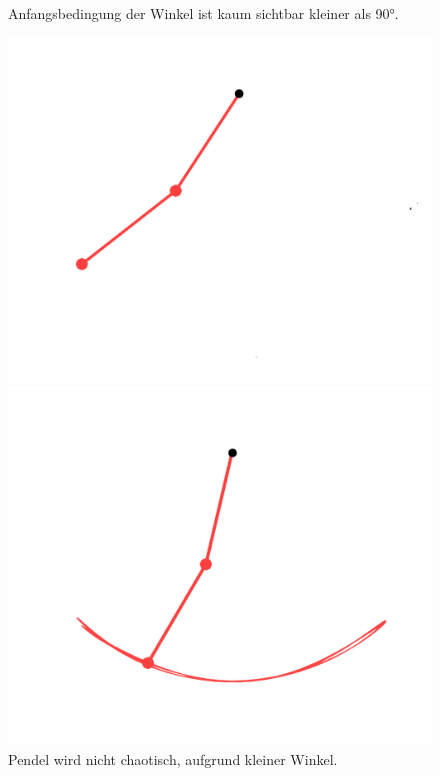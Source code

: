 \begin{figure}
\begin{minipage}{0.45\textwidth}
    \end{minipage}
    \caption{Anfangsbedingung der Winkel ist kaum sichtbar kleiner als 90°.}
    \label{fig:pendel_bei_weniger_90}
    \centering
    \begin{minipage}{0.45\textwidth}
        \centering
        \includegraphics[width=\textwidth]{papers/doppelpendel/images/pendel_stand_nichtchaotisch.png}
    \end{minipage}
    \hfill
    \begin{minipage}{0.45\textwidth}
        \centering
        \includegraphics[width=\textwidth]{papers/doppelpendel/images/pendel_spur_nichtchaotisch.png}
    \end{minipage}
    \caption{Pendel wird nicht chaotisch, aufgrund kleiner Winkel.}
    \label{fig:pendel_nichtchaotisch}
\end{figure}

